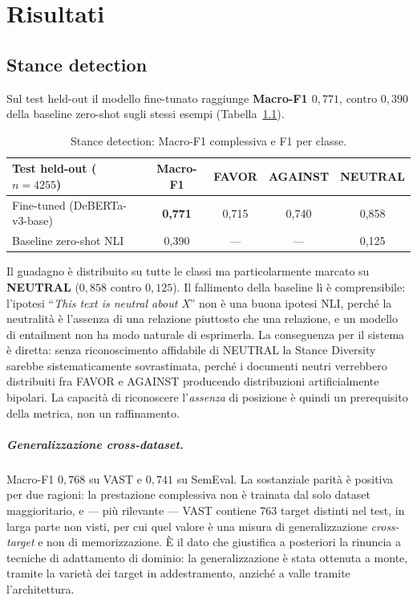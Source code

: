 \documentclass[11pt,a4paper]{report}
\begin{document}
\chapter{Risultati}\label{cap:risultati}

\section{Stance detection}\label{sec:ris-stance}
Sul test held-out il modello fine-tunato raggiunge \textbf{Macro-F1 $0{,}771$}, contro $0{,}390$
della baseline zero-shot sugli stessi esempi (Tabella~\ref{tab:stance}).

\begin{table}[t]
\centering
\small
\begin{tabular}{lcccc}
\toprule
\textbf{Test held-out} ($n = 4255$) & \textbf{Macro-F1} & \textbf{FAVOR} & \textbf{AGAINST} & \textbf{NEUTRAL} \\
\midrule
Fine-tuned (DeBERTa-v3-base) & \textbf{0,771} & 0,715 & 0,740 & 0,858 \\
Baseline zero-shot NLI       & 0,390 & --- & --- & 0,125 \\
\bottomrule
\end{tabular}
\caption{Stance detection: Macro-F1 complessiva e F1 per classe.}
\label{tab:stance}
\end{table}

Il guadagno è distribuito su tutte le classi ma particolarmente marcato su \textbf{NEUTRAL}
($0{,}858$ contro $0{,}125$). Il fallimento della baseline lì è comprensibile: l'ipotesi
``\emph{This text is neutral about X}'' non è una buona ipotesi NLI, perché la neutralità è
l'assenza di una relazione piuttosto che una relazione, e un modello di entailment non ha modo
naturale di esprimerla. La conseguenza per il sistema è diretta: senza riconoscimento affidabile
di NEUTRAL la Stance Diversity sarebbe sistematicamente sovrastimata, perché i documenti neutri
verrebbero distribuiti fra FAVOR e AGAINST producendo distribuzioni artificialmente bipolari. La
capacità di riconoscere l'\emph{assenza} di posizione è quindi un prerequisito della metrica, non
un raffinamento.

\paragraph{Generalizzazione cross-dataset.} Macro-F1 $0{,}768$ su VAST e $0{,}741$ su SemEval. La
sostanziale parità è positiva per due ragioni: la prestazione complessiva non è trainata dal solo
dataset maggioritario, e --- più rilevante --- VAST contiene 763 target distinti nel test, in larga
parte non visti, per cui quel valore è una misura di generalizzazione \emph{cross-target} e non di
memorizzazione. È il dato che giustifica a posteriori la rinuncia a tecniche di adattamento di
dominio: la generalizzazione è stata ottenuta a monte, tramite la varietà dei target in
addestramento, anziché a valle tramite l'architettura.
\end{document}
